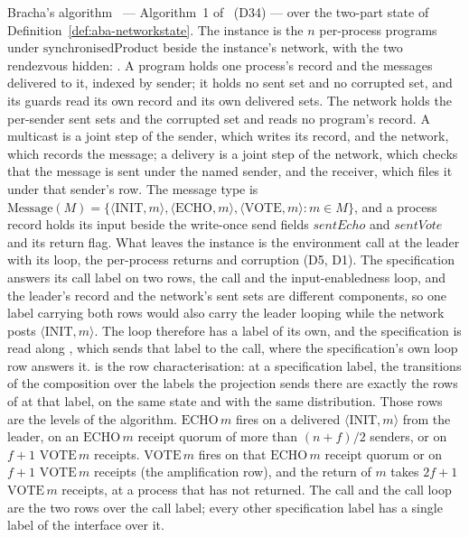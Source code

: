\begin{definition}
  \label{def:aba-brb-impl}
  \leanok
  Bracha's algorithm~\cite{Bra87} --- Algorithm~1 of~\cite{AFW25} (D34) --- over the two-part state of Definition~\ref{def:aba-networkstate}.
  The instance is the $n$ per-process programs under $\mathrm{synchronisedProduct}$ beside the instance's network, with the two rendezvous hidden: .
  A program holds one process's record and the messages delivered to it, indexed by sender; it holds no sent set and no corrupted set, and its guards read its own record and its own delivered sets.
  The network holds the per-sender sent sets and the corrupted set and reads no program's record.
  A multicast is a joint step of the sender, which writes its record, and the network, which records the message; a delivery is a joint step of the network, which checks that the message is sent under the named sender, and the receiver, which files it under that sender's row.
  The message type is $\mathrm{Message}(M) = \{\langle\mathrm{INIT}, m\rangle, \langle\mathrm{ECHO}, m\rangle, \langle\mathrm{VOTE}, m\rangle : m \in M\}$, and a process record holds its input beside the write-once send fields $\mathit{sentEcho}$ and $\mathit{sentVote}$ and its return flag.
  What leaves the instance is the environment call at the leader with its loop, the per-process returns and corruption (D5, D1).
  The specification answers its call label on two rows, the call and the input-enabledness loop, and the leader's record and the network's sent sets are different components, so one label carrying both rows would also carry the leader looping while the network posts $\langle\mathrm{INIT}, m\rangle$.
  The loop therefore has a label of its own, and the specification is read along , which sends that label to the call, where the specification's own loop row answers it.
   is the row characterisation: at a specification label, the transitions of the composition over the labels the projection sends there are exactly the rows of  at that label, on the same state and with the same distribution.
  Those rows are the levels of the algorithm.
  $\mathrm{ECHO}\,m$ fires on a delivered $\langle\mathrm{INIT}, m\rangle$ from the leader, on an $\mathrm{ECHO}\,m$ receipt quorum of more than $(n+f)/2$ senders, or on $f{+}1$ $\mathrm{VOTE}\,m$ receipts.
  $\mathrm{VOTE}\,m$ fires on that $\mathrm{ECHO}\,m$ receipt quorum or on $f{+}1$ $\mathrm{VOTE}\,m$ receipts (the amplification row), and the return of $m$ takes $2f{+}1$ $\mathrm{VOTE}\,m$ receipts, at a process that has not returned.
  The call and the call loop are the two rows over the call label; every other specification label has a single label of the interface over it.
\end{definition}
